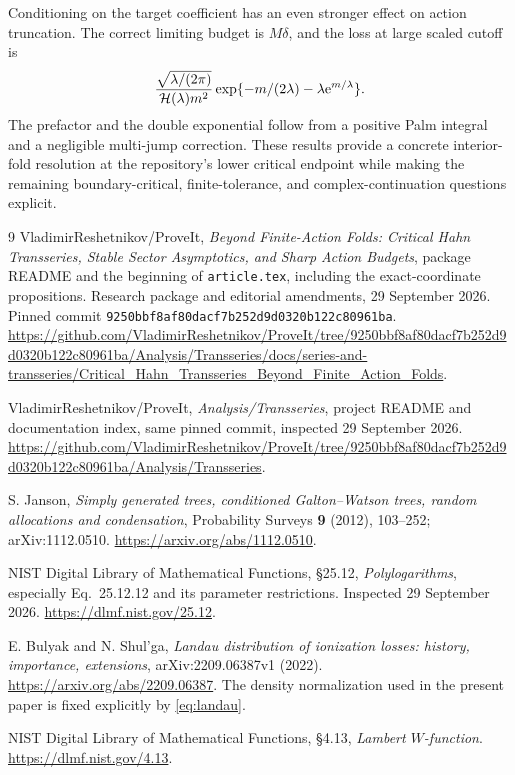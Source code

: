 \documentclass[11pt,a4paper]{article}
\numberwithin{equation}{section}
\theoremstyle{definition}
\theoremstyle{remark}
\newcommand{\HH}{\mathcal H}\newcommand{\RR}{\mathcal R}
\begin{document}
Conditioning on the target coefficient has an even stronger effect on
action truncation. The correct limiting budget is \(M\delta\), and
the loss at large scaled cutoff is
\[
 \frac{\sqrt{\la/(2\pi)}}{\HH(\la)m^2}
 \exp\{-m/(2\la)-\la\ee^{m/\la}\}.
\]
The prefactor and the double exponential follow from a positive Palm
integral and a negligible multi-jump correction. These results provide
a concrete interior-fold resolution at the repository's lower
critical endpoint while making the remaining boundary-critical,
finite-tolerance, and complex-continuation questions explicit.

\clearpage
\begin{thebibliography}{9}
VladimirReshetnikov/ProveIt,
\emph{Beyond Finite-Action Folds: Critical Hahn Transseries, Stable Sector
Asymptotics, and Sharp Action Budgets}, package README and the beginning
of \texttt{article.tex}, including the exact-coordinate propositions.
Research package and editorial amendments, 29 September 2026.
Pinned commit \texttt{9250bbf8af80dacf7b252d9d0320b122c80961ba}.
\url{https://github.com/VladimirReshetnikov/ProveIt/tree/9250bbf8af80dacf7b252d9d0320b122c80961ba/Analysis/Transseries/docs/series-and-transseries/Critical_Hahn_Transseries_Beyond_Finite_Action_Folds}.

VladimirReshetnikov/ProveIt,
\emph{Analysis/Transseries}, project README and documentation index,
same pinned commit, inspected 29 September 2026.
\url{https://github.com/VladimirReshetnikov/ProveIt/tree/9250bbf8af80dacf7b252d9d0320b122c80961ba/Analysis/Transseries}.

S. Janson,
\emph{Simply generated trees, conditioned Galton--Watson trees, random
allocations and condensation}, Probability Surveys \textbf{9} (2012),
103--252; arXiv:1112.0510.
\url{https://arxiv.org/abs/1112.0510}.

NIST Digital Library of Mathematical Functions,
\S25.12, \emph{Polylogarithms}, especially Eq.~25.12.12 and its
parameter restrictions. Inspected 29 September 2026.
\url{https://dlmf.nist.gov/25.12}.

E. Bulyak and N. Shul'ga,
\emph{Landau distribution of ionization losses: history, importance,
extensions}, arXiv:2209.06387v1 (2022).
\url{https://arxiv.org/abs/2209.06387}.
The density normalization used in the present paper is fixed explicitly
by \eqref{eq:landau}.

NIST Digital Library of Mathematical Functions,
\S4.13, \emph{Lambert \(W\)-function}.
\url{https://dlmf.nist.gov/4.13}.
\end{thebibliography}
\end{document}
